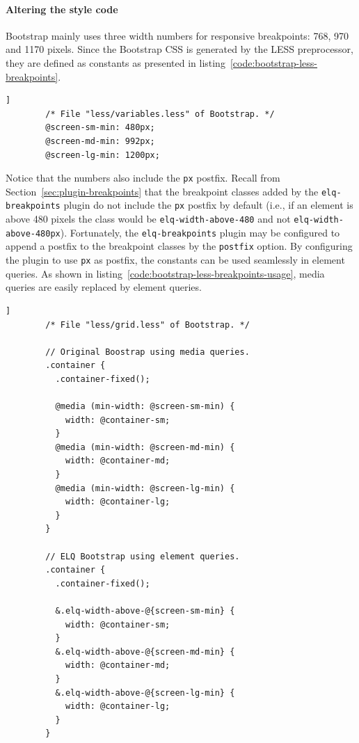 \documentclass[a4paper,11pt]{kth-mag}
\newcommand{\code}[1]{\texttt{#1}}
\begin{document}
      \paragraph{Altering the style code}
      \gls{Bootstrap} mainly uses three width numbers for \gls{responsive} breakpoints: 768, 970 and 1170 pixels.
      Since the \gls{Bootstrap} \gls{CSS} is generated by the \gls{LESS} preprocessor, they are defined as constants as presented in listing~\ref{code:bootstrap-less-breakpoints}.
      \begin{lstlisting}[gobble=8,label={code:bootstrap-less-breakpoints},caption={The main breakpoints used by \gls{Bootstrap} defined as \gls{LESS} constants.},captionpos=b]]
        /* File "less/variables.less" of Bootstrap. */
        @screen-sm-min: 480px;
        @screen-md-min: 992px;
        @screen-lg-min: 1200px;
      \end{lstlisting}
      Notice that the numbers also include the \code{px} postfix.
      Recall from Section~\ref{sec:plugin-breakpoints} that the breakpoint classes added by the \code{elq-breakpoints} plugin do not include the \code{px} postfix by default (i.e., if an element is above 480 pixels the class would be \code{elq-width-above-480} and not \code{elq-width-above-480px}).
      Fortunately, the \code{elq-breakpoints} plugin may be configured to append a postfix to the breakpoint classes by the \code{postfix} option.
      By configuring the plugin to use \code{px} as postfix, the constants can be used seamlessly in element queries.
      As shown in listing~\ref{code:bootstrap-less-breakpoints-usage}, \gls{media queries} are easily replaced by element queries.
      \begin{lstlisting}[gobble=8,label={code:bootstrap-less-breakpoints-usage},caption={Media queries can easily be replaced with element queries. By using the \code{elq-breakpoints} postfix option, the breakpoint constants can be used directly in the selectors. Notice that only three lines have been altered.},captionpos=b]]
        /* File "less/grid.less" of Bootstrap. */

        // Original Boostrap using media queries.
        .container {
          .container-fixed();

          @media (min-width: @screen-sm-min) {
            width: @container-sm;
          }
          @media (min-width: @screen-md-min) {
            width: @container-md;
          }
          @media (min-width: @screen-lg-min) {
            width: @container-lg;
          }
        }

        // ELQ Bootstrap using element queries.
        .container {
          .container-fixed();

          &.elq-width-above-@{screen-sm-min} {
            width: @container-sm;
          }
          &.elq-width-above-@{screen-md-min} {
            width: @container-md;
          }
          &.elq-width-above-@{screen-lg-min} {
            width: @container-lg;
          }
        }
      \end{lstlisting}
\end{document}
